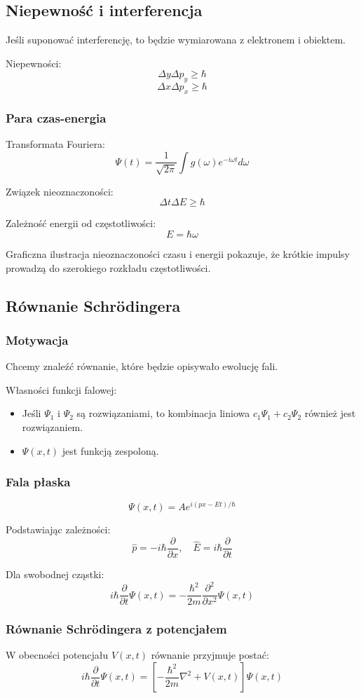 \subsection{Niepewność i interferencja}

Jeśli suponować interferencję, to będzie wymiarowana z elektronem i obiektem.

Niepewności:
\[
\Delta y \Delta p_y \geq \hbar
\]
\[
\Delta x \Delta p_x \geq \hbar
\]

\subsubsection{Para czas-energia}
Transformata Fouriera:
\[
\Psi(t) = \frac{1}{\sqrt{2\pi}} \int g(\omega) e^{-i\omega t} d\omega
\]

Związek nieoznaczoności:
\[
\Delta t \Delta E \geq \hbar
\]

Zależność energii od częstotliwości:
\[
E = \hbar \omega
\]

Graficzna ilustracja nieoznaczoności czasu i energii pokazuje, że krótkie impulsy prowadzą do szerokiego rozkładu częstotliwości.

\subsection{Równanie Schrödingera}

\subsubsection{Motywacja}
Chcemy znaleźć równanie, które będzie opisywało ewolucję fali.

Własności funkcji falowej:
\begin{itemize}
    \item Jeśli $\Psi_1$ i $\Psi_2$ są rozwiązaniami, to kombinacja liniowa $c_1 \Psi_1 + c_2 \Psi_2$ również jest rozwiązaniem.
    \item $\Psi(x,t)$ jest funkcją zespoloną.
\end{itemize}

\subsubsection{Fala płaska}
\[
\Psi(x,t) = A e^{i(px - Et)/\hbar}
\]

Podstawiając zależności:
\[
\hat{p} = -i\hbar \frac{\partial}{\partial x}, \quad \hat{E} = i\hbar \frac{\partial}{\partial t}
\]

Dla swobodnej cząstki:
\[
i\hbar \frac{\partial}{\partial t} \Psi(x,t) = -\frac{\hbar^2}{2m} \frac{\partial^2}{\partial x^2} \Psi(x,t)
\]

\subsubsection{Równanie Schrödingera z potencjałem}
W obecności potencjału $V(x,t)$ równanie przyjmuje postać:
\[
i\hbar \frac{\partial}{\partial t} \Psi(x,t) = \left[ -\frac{\hbar^2}{2m} \nabla^2 + V(x,t) \right] \Psi(x,t)
\]
